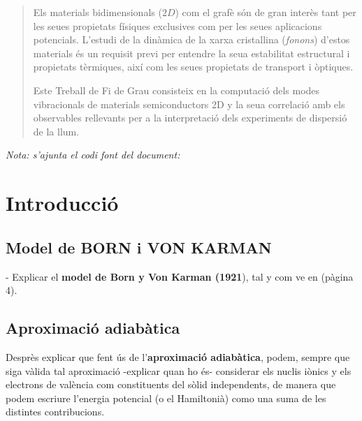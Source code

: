 \documentclass[12pt,twoside,a4paper, notitlepage]{article}%
\author{Casimiro Victoria Castillo}
\begin{document}



\begin{abstract}
  Els materials bidimensionals ($2D$) com el grafè són de gran interès tant per les seues propietats físiques exclusives com per les seues aplicacions potencials. L'estudi de la dinàmica de la xarxa cristallina (\textit{fonons}) d'estos materials és un requisit previ per entendre la seua estabilitat estructural i propietats tèrmiques, així com les seues propietats de transport i òptiques.   


  Este Treball de Fi de Grau consisteix en la computació dels modes vibracionals de materials semiconductors 2D y la seua correlació amb els observables rellevants per a la interpretació dels experiments de dispersió de la llum.
\end{abstract}

\textit{Nota: s'ajunta el codi font del document: }

\newpage

\section{Introducció}


\subsection{Model de BORN i VON KARMAN}
- Explicar el \textbf{model de  Born y  Von Karman (1921}), tal y com ve en \cite{Balkanski_2000} \cite{brueesch82_phonon} (pàgina 4).


\subsection{Aproximació adiabàtica}
Desprès explicar que fent ús de l'\textbf{aproximació adiabàtica}, podem, sempre que siga vàlida tal aproximació -explicar quan ho és- considerar els nuclis iònics y els electrons de valència com constituents del sòlid independents, de manera que podem escriure l'energia potencial (o el Hamiltonià) como una suma de les distintes contribucions.
  
\end{document}

